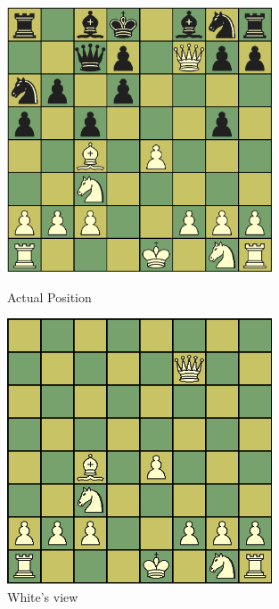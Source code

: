 \documentclass[10pt, conference, compsocconf]{IEEEtran}
\begin{document}
\begin{figure}[ht]
\centering
\begin{minipage}[b]{0.45\linewidth}
\centering
\includegraphics[width=0.7\textwidth]{images/9B.png}
\caption{Actual Position}
\label{fig:figure1}
\end{minipage}
\hspace{0.5cm}
\centering
\begin{minipage}[b]{0.45\linewidth}
\centering
\includegraphics[width=0.7\textwidth]{images/OneView.png}
\caption{White's view}
\label{fig:figure2}
\end{minipage}
\vspace{-0.2in}
\end{figure}
\end{document}
